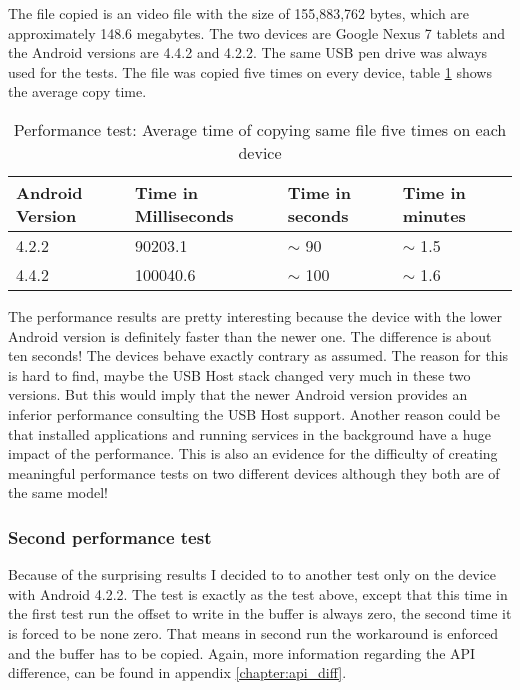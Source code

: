 The file copied is an video file with the size of 155,883,762 bytes, which are approximately 148.6 megabytes. The two devices are Google Nexus 7 tablets and the Android versions are 4.4.2 and 4.2.2. The same USB pen drive was always used for the tests. The file was copied five times on every device, table \ref{table:performance_test} shows the average copy time.

\begin{table}[ht]
\caption{Performance test: Average time of copying same file five times on each device}
\centering
\begin{tabular}{|l|l|l|l|}
\hline\hline
\textbf{Android Version} & \textbf{Time in Milliseconds} & \textbf{Time in seconds} & \textbf{Time in minutes} \\ \hline
4.2.2 & 90203.1 & $\sim$ 90 & $\sim$ 1.5 \\ \hline
4.4.2 & 100040.6 & $\sim$ 100 & $\sim$ 1.6 \\ \hline
\end{tabular}
\label{table:performance_test}
\end{table}

The performance results are pretty interesting because the device with the lower Android version is definitely faster than the newer one. The difference is about ten seconds! The devices behave exactly contrary as assumed. The reason for this is hard to find, maybe the USB Host stack changed very much in these two versions. But this would imply that the newer Android version provides an inferior performance consulting the USB Host support. Another reason could be that installed applications and running services in the background have a huge impact of the performance. This is also an evidence for the difficulty of creating meaningful performance tests on two different devices although they both are of the same model!

\subsubsection{Second performance test}

Because of the surprising results I decided to to another test only on the device with Android 4.2.2. The test is exactly as the test above, except that this time in the first test run the offset to write in the buffer is always zero, the second time it is forced to be none zero. That means in second run the workaround is enforced and the buffer has to be copied. Again, more information regarding the API difference, can be found in appendix \ref{chapter:api_diff}.


